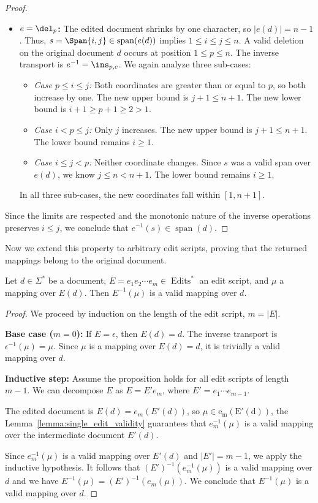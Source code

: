 \begin{proof}
\begin{itemize}
		\vspace{0.3cm}
		\item \textbf{$e = \del_p$:} 
		The edited document shrinks by one character, so $|e(d)| = n-1$. 
		Thus, $s = \Span{i,j} \in \operatorname{span}(e(d))$ implies $1 \leq i \leq j \leq n$. 
		A valid deletion on the original document $d$ occurs at position $1 \leq p \leq n$. The inverse transport is $e^{-1} = \ins_{p,c}$. We again analyze three sub-cases:
		\begin{itemize}
			\item \textit{Case $p \leq i \leq j$:} Both coordinates are greater than or equal to $p$, so both increase by one. The new upper bound is $j+1 \leq n+1$. The new lower bound is $i+1 \geq p+1 \geq 2 > 1$.
			\item \textit{Case $i < p \leq j$:} Only $j$ increases. The new upper bound is $j+1 \leq n+1$. The lower bound remains $i \geq 1$.
			\item \textit{Case $i \leq j < p$:} Neither coordinate changes. Since $s$ was a valid span over $e(d)$, we know $j \leq n < n+1$. The lower bound remains $i \geq 1$.
		\end{itemize}
		In all three sub-cases, the new coordinates fall within $[1, n+1]$.
	\end{itemize}
	Since the limits are respected and the monotonic nature of the inverse operations preserves $i \leq j$, we conclude that $e^{-1}(s) \in \operatorname{span}(d)$.
\end{proof}

Now we extend this property to arbitrary edit scripts, proving that the returned mappings belong to the original document.

\begin{proposition}
	Let $d \in \Sigma^*$ be a document, $E = e_1e_2\cdots e_m \in \operatorname{Edits}^*$ an edit script, and $\mu$ a mapping over $E(d)$. 
	Then $E^{-1}(\mu)$ is a valid mapping over $d$.
\end{proposition}

\begin{proof}
	We proceed by induction on the length of the edit script, $m = |E|$.
	
	\textbf{Base case ($m=0$):} 
	If $E = \epsilon$, then $E(d) = d$. 
	The inverse transport is $\epsilon^{-1}(\mu) = \mu$. 
	Since $\mu$ is a mapping over $E(d)=d$, it is trivially a valid mapping over $d$.
	
	\textbf{Inductive step:} 
	Assume the proposition holds for all edit scripts of length $m-1$.
	We can decompose $E$ as $E = E' e_m$, where $E' = e_1 \cdots e_{m-1}$. 

	The edited document is $E(d) = e_m(E'(d))$, so $\mu \in \operatorname{e_m(E'(d))}$, the Lemma~\ref{lemma:single_edit_validity} guarantees that $e_m^{-1}(\mu)$ is a valid mapping over the intermediate document $E'(d)$.
	
	Since $e_m^{-1}(\mu)$ is a valid mapping over $E'(d)$ and $|E'| = m-1$, we apply the inductive hypothesis. 
	It follows that $(E')^{-1}(e_m^{-1}(\mu))$ is a valid mapping over $d$ and we have $E^{-1}(\mu) = (E')^{-1}(e_m(\mu))$. We conclude that $E^{-1}(\mu)$ is a valid mapping over $d$.
\end{proof}

